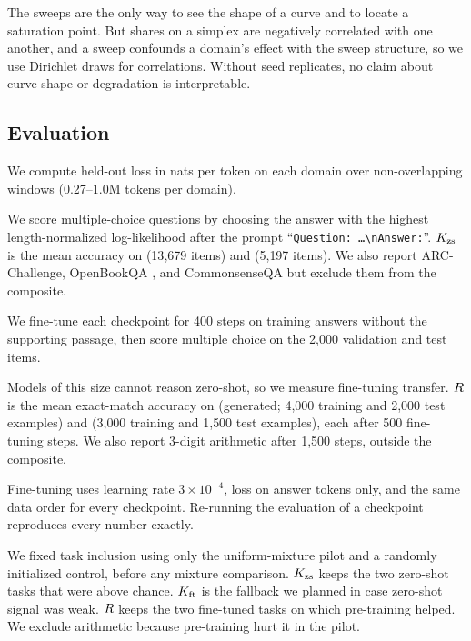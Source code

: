 The sweeps are the only way to see the shape of a curve and to locate a saturation point.
But shares on a simplex are negatively correlated with one another, and a sweep confounds a domain's effect with the sweep structure, so we use Dirichlet draws for correlations.
Without seed replicates, no claim about curve shape or degradation is interpretable.

\subsection{Evaluation}

We compute held-out loss in nats per token on each domain over non-overlapping windows (0.27--1.0M tokens per domain).

We score multiple-choice questions by choosing the answer with the highest length-normalized log-likelihood after the prompt ``\texttt{Question:\,\ldots\textbackslash nAnswer:}''.
$K_{\mathrm{zs}}$ is the mean accuracy on \sciq \citep{welbl2017sciq} (13{,}679 items) and \arceasy \citep{clark2018arc} (5{,}197 items).
We also report ARC-Challenge, OpenBookQA \citep{mihaylov2018openbookqa}, and CommonsenseQA \citep{talmor2019commonsenseqa} but exclude them from the composite.

We fine-tune each checkpoint for 400 steps on \sciq training answers without the supporting passage, then score multiple choice on the 2{,}000 validation and test items.

Models of this size cannot reason zero-shot, so we measure fine-tuning transfer.
$R$ is the mean exact-match accuracy on \listops \citep{nangia2018listops} (generated; 4{,}000 training and 2{,}000 test examples) and \proofwriter \citep{tafjord2021proofwriter} (3{,}000 training and 1{,}500 test examples), each after 500 fine-tuning steps.
We also report 3-digit arithmetic after 1{,}500 steps, outside the composite.

Fine-tuning uses learning rate $3 \times 10^{-4}$, loss on answer tokens only, and the same data order for every checkpoint.
Re-running the evaluation of a checkpoint reproduces every number exactly.

We fixed task inclusion using only the uniform-mixture pilot and a randomly initialized control, before any mixture comparison.
$K_{\mathrm{zs}}$ keeps the two zero-shot tasks that were above chance.
$K_{\mathrm{ft}}$ is the fallback we planned in case zero-shot signal was weak.
$R$ keeps the two fine-tuned tasks on which pre-training helped.
We exclude arithmetic because pre-training hurt it in the pilot.


